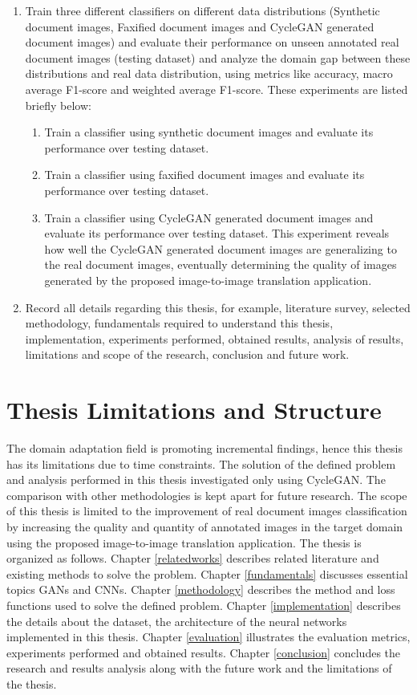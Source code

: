\begin{enumerate}
\item Train three different classifiers on different data distributions (Synthetic document images, Faxified document images and \ac{CycleGAN} generated document images) and evaluate their performance on unseen annotated real document images (testing dataset) and analyze the domain gap between these distributions and real data distribution, using metrics like accuracy, macro average F1-score and weighted average F1-score. These experiments are listed briefly below:
	\begin{enumerate}
	     	\item Train a classifier using synthetic document images and evaluate its performance over testing dataset.
     	     	\item Train a classifier using faxified document images and evaluate its performance over testing dataset.
     		\item Train a classifier using \ac{CycleGAN} generated document images and evaluate its performance over testing dataset. This experiment reveals how well the \ac{CycleGAN} generated document images are generalizing to the real document images, eventually determining the quality of images generated by the proposed image-to-image translation application.
    	\end{enumerate}
\item Record all details regarding this thesis, for example, literature survey, selected methodology, fundamentals required to understand this thesis, implementation, experiments performed, obtained results, analysis of results, limitations and scope of the research, conclusion and future work.
\end{enumerate}


\section{Thesis Limitations and Structure}\label{thesisstructurelimitations}
The domain adaptation field is promoting incremental findings, hence this thesis has its limitations due to time constraints. The solution of the defined problem and analysis performed in this thesis investigated only using \ac{CycleGAN}. The comparison with other methodologies is kept apart for future research. The scope of this thesis is limited to the improvement of real document images classification by increasing the quality and quantity of annotated images in the target domain using the proposed image-to-image translation application. The thesis is organized as follows. Chapter \ref{relatedworks} describes related literature and existing methods to solve the problem. Chapter \ref{fundamentals} discusses essential topics \acp{GAN} and \acp{CNN}. Chapter \ref{methodology} describes the method and loss functions used to solve the defined problem. Chapter \ref{implementation} describes the details about the dataset, the architecture of the neural networks implemented in this thesis. Chapter \ref{evaluation} illustrates the evaluation metrics, experiments performed and obtained results. Chapter \ref{conclusion} concludes the research and results analysis along with the future work and the limitations of the thesis.






